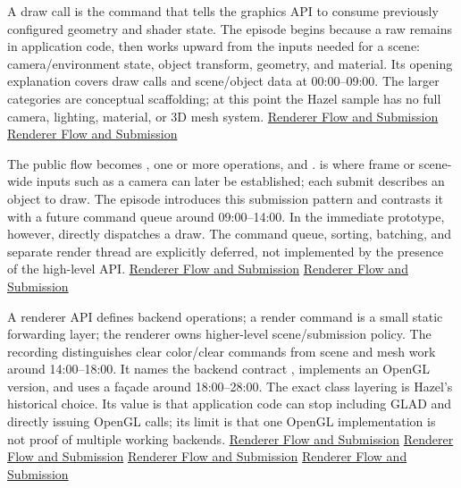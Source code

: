 \hypertarget{06-engine-ii-ch025-put-a-render-api-under-scene-level-submission-calls}{}

A draw call is the command that tells the graphics API to consume previously configured geometry and shader state. The episode begins because a raw  remains in application code, then works upward from the inputs needed for a scene: camera/environment state, object transform, geometry, and material. Its opening explanation covers draw calls and scene/object data at 00:00--09:00. The larger categories are conceptual scaffolding; at this point the Hazel sample has no full camera, lighting, material, or 3D mesh system. \href{https://www.youtube.com/watch?v=akxevYYWd9g&t=0s}{Renderer Flow and Submission} \href{https://www.youtube.com/watch?v=akxevYYWd9g&t=270s}{Renderer Flow and Submission}

The public flow becomes , one or more  operations, and .  is where frame or scene-wide inputs such as a camera can later be established; each submit describes an object to draw. The episode introduces this submission pattern and contrasts it with a future command queue around 09:00--14:00. In the immediate prototype, however,  directly dispatches a draw. The command queue, sorting, batching, and separate render thread are explicitly deferred, not implemented by the presence of the high-level API. \href{https://www.youtube.com/watch?v=akxevYYWd9g&t=540s}{Renderer Flow and Submission} \href{https://www.youtube.com/watch?v=akxevYYWd9g&t=720s}{Renderer Flow and Submission}

A renderer API defines backend operations; a render command is a small static forwarding layer; the renderer owns higher-level scene/submission policy. The recording distinguishes clear color/clear commands from scene and mesh work around 14:00--18:00. It names the backend contract , implements an OpenGL version, and uses a  façade around 18:00--28:00. The exact class layering is Hazel's historical choice. Its value is that application code can stop including GLAD and directly issuing OpenGL calls; its limit is that one OpenGL implementation is not proof of multiple working backends. \href{https://www.youtube.com/watch?v=akxevYYWd9g&t=840s}{Renderer Flow and Submission} \href{https://www.youtube.com/watch?v=akxevYYWd9g&t=1080s}{Renderer Flow and Submission} \href{https://www.youtube.com/watch?v=akxevYYWd9g&t=1380s}{Renderer Flow and Submission} \href{https://www.youtube.com/watch?v=akxevYYWd9g&t=1560s}{Renderer Flow and Submission}

